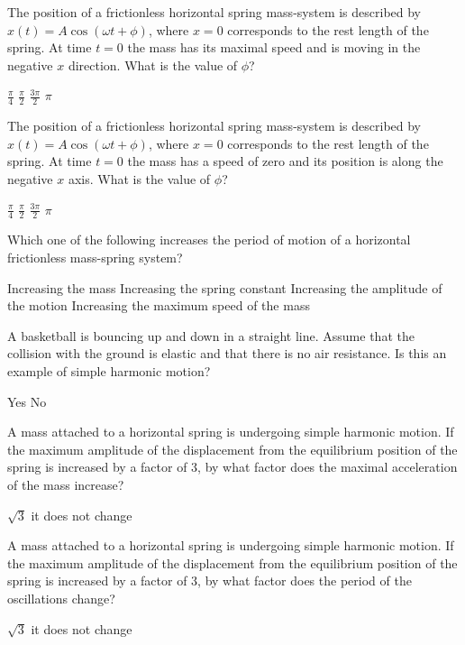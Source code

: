 \question The position of a frictionless horizontal spring mass-system is described by $x(t)=A\cos(\omega t + \phi)$, where $x=0$ corresponds to the rest length of the spring. At time $t=0$ the mass has its maximal speed and is moving in the negative $x$ direction. What is the value of $\phi$?
\begin{checkboxes}
	\choice $\frac{\pi}{4}$
	\CorrectChoice $\frac{\pi}{2}$
	\choice $\frac{3\pi}{2}$
	\choice $\pi$
\end{checkboxes}

\question The position of a frictionless horizontal spring mass-system is described by $x(t)=A\cos(\omega t + \phi)$, where $x=0$ corresponds to the rest length of the spring. At time $t=0$ the mass has a speed of zero and its position is along the negative $x$ axis. What is the value of $\phi$?
\begin{checkboxes}
	\choice $\frac{\pi}{4}$
	\choice $\frac{\pi}{2}$
	\choice $\frac{3\pi}{2}$
	\CorrectChoice $\pi$
\end{checkboxes}


\question  Which one of the following increases the period of motion of a horizontal frictionless mass-spring system?
\begin{checkboxes}
	\CorrectChoice Increasing the mass
	\choice Increasing the spring constant
	\choice Increasing the amplitude of the motion
	\choice Increasing the maximum speed of the mass
\end{checkboxes}


\question  A basketball is bouncing up and down in a straight line. Assume that the collision with the ground is elastic and that there is no air resistance. Is this an example of simple harmonic motion?
\begin{checkboxes}
	\choice Yes 
	\CorrectChoice No
\end{checkboxes}

\question A mass attached to a horizontal spring is undergoing simple harmonic motion. If the maximum amplitude of the displacement from the equilibrium position of the spring is increased by a factor of 3, by what factor does the maximal acceleration of the mass increase?
\begin{checkboxes}
\choice $\sqrt{3}$
 \correct
{}
\choice it does not change
\end{checkboxes}

\question A mass attached to a horizontal spring is undergoing simple harmonic motion. If the maximum amplitude of the displacement from the equilibrium position of the spring is increased by a factor of 3, by what factor does the period of the oscillations change?
\begin{checkboxes}
\choice $\sqrt{3}$
\CorrectChoice it does not change \correct
\end{checkboxes}

